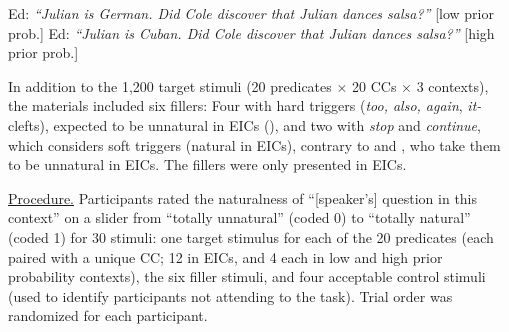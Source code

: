 \documentclass[12pt,fleqn]{article}
\newcommand{\6}{\mbox{$[\hspace*{-.6mm}[$}}
\newcommand{\9}{\mbox{$]\hspace*{-.6mm}]$}}
\begin{document}
\vspace*{-.2cm}
\begin{exe}
\ex\label{sample}
\begin{xlist}
\ex Ed: {\em ``Julian is German. Did Cole discover that Julian dances salsa?''} \hspace*{-.2cm} \hfill [low prior prob.]
\ex Ed: {\em ``Julian is Cuban. Did Cole discover that Julian dances salsa?''} \hfill [high prior prob.]
\end{xlist}
\end{exe}
\vspace*{-.2cm}

In addition to the 1,200 target stimuli (20 predicates $\times$ 20 CCs $\times$ 3 contexts), the materials included six fillers: Four with hard triggers ({\em too, also, again},  {\em it-}clefts), expected to be unnatural in EICs (\citealt{simons01,abusch10}), and two with {\em stop} and {\em continue}, which \citealt{simons01} considers soft triggers (natural in EICs), contrary to \citealt{mandelkern-etal2020} and \citealt{kalomoiros-schwarz2021}, who take them to be unnatural in EICs. The fillers were only presented in EICs.

\noindent
\underline{Procedure.} Participants rated the naturalness of ``[speaker's] question in this context'' on a slider from ``totally unnatural'' (coded 0) to ``totally natural'' (coded 1) for 30 stimuli: one target stimulus for each of the 20 predicates (each paired with a unique CC; 12 in EICs, and 4 each in low and high prior probability contexts), the six filler stimuli, and four acceptable control stimuli (used to identify participants not attending to the task). Trial order was randomized for each participant.

\end{document}
